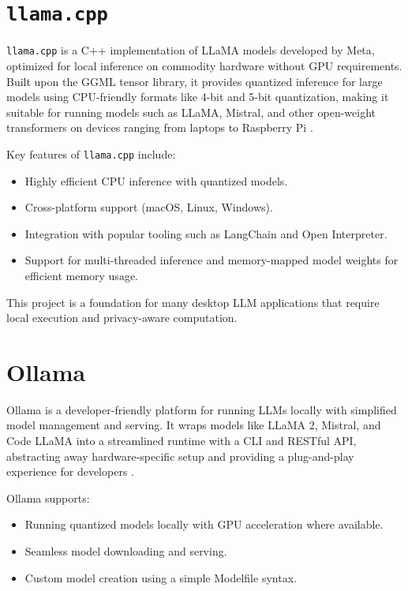 \section{\texttt{llama.cpp}}

\texttt{llama.cpp} is a C++ implementation of LLaMA models developed by Meta, optimized for local inference on commodity hardware without GPU requirements. Built upon the GGML tensor library, it provides quantized inference for large models using CPU-friendly formats like 4-bit and 5-bit quantization, making it suitable for running models such as LLaMA, Mistral, and other open-weight transformers on devices ranging from laptops to Raspberry Pi \cite{llamacpp}.

Key features of \texttt{llama.cpp} include:
\begin{itemize}
    \item Highly efficient CPU inference with quantized models.
    \item Cross-platform support (macOS, Linux, Windows).
    \item Integration with popular tooling such as LangChain and Open Interpreter.
    \item Support for multi-threaded inference and memory-mapped model weights for efficient memory usage.
\end{itemize}

This project is a foundation for many desktop LLM applications that require local execution and privacy-aware computation.

\section{Ollama}

Ollama is a developer-friendly platform for running LLMs locally with simplified model management and serving. It wraps models like LLaMA 2, Mistral, and Code LLaMA into a streamlined runtime with a CLI and RESTful API, abstracting away hardware-specific setup and providing a plug-and-play experience for developers \cite{ollama}.

Ollama supports:
\begin{itemize}
    \item Running quantized models locally with GPU acceleration where available.
    \item Seamless model downloading and serving.
    \item Custom model creation using a simple Modelfile syntax.
\end{itemize}

